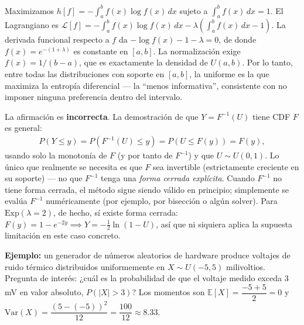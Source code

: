 \begin{solproblema}[prob:5794e09]
	Maximizamos $h[f] = -\int_a^b f(x)\log f(x)\,dx$ sujeto a $\int_a^b f(x)\,dx=1$. El Lagrangiano es $\mathcal{L}[f] = -\int_a^b f(x)\log f(x)\,dx - \lambda\left(\int_a^b f(x)\,dx - 1\right)$. La derivada funcional respecto a $f$ da $-\log f(x) - 1 - \lambda = 0$, de donde $f(x) = e^{-(1+\lambda)}$ es constante en $[a,b]$. La normalización exige $f(x) = 1/(b-a)$, que es exactamente la densidad de $U(a,b)$. Por lo tanto, entre todas las distribuciones con soporte en $[a,b]$, la uniforme es la que maximiza la entropía diferencial — la ``menos informativa'', consistente con no imponer ninguna preferencia dentro del intervalo.
\end{solproblema}

\begin{solproblema}[prob:126be41]
	La afirmación es \textbf{incorrecta}. La demostración de que $Y=F^{-1}(U)$ tiene CDF $F$ es general:
	\begin{align*}
		P(Y\le y) = P(F^{-1}(U)\le y) = P(U\le F(y)) = F(y),
	\end{align*}
	usando solo la monotonía de $F$ (y por tanto de $F^{-1}$) y que $U\sim U(0,1)$. Lo único que realmente se necesita es que $F$ sea invertible (estrictamente creciente en su soporte) — no que $F^{-1}$ tenga una \emph{forma cerrada explícita}. Cuando $F^{-1}$ no tiene forma cerrada, el método sigue siendo válido en principio; simplemente se evalúa $F^{-1}$ numéricamente (por ejemplo, por bisección o algún solver). Para $\text{Exp}(\lambda=2)$, de hecho, sí existe forma cerrada: $F(y)=1-e^{-2y} \implies Y = -\tfrac{1}{2}\ln(1-U)$, así que ni siquiera aplica la supuesta limitación en este caso concreto.
\end{solproblema}

\begin{solproblema}
	\textbf{Ejemplo:} un generador de números aleatorios de hardware produce voltajes de ruido térmico distribuidos uniformemente en $X \sim U(-5, 5)$ milivoltios. Pregunta de interés: ¿cuál es la probabilidad de que el voltaje medido exceda $3$ mV en valor absoluto, $P(|X|>3)$? Los momentos son $\mathbb{E}[X] = \dfrac{-5+5}{2} = 0$ y $\text{Var}(X) = \dfrac{(5-(-5))^2}{12} = \dfrac{100}{12} \approx 8.33$.
\end{solproblema}
